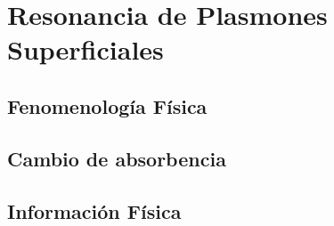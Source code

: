 \section{Resonancia de Plasmones Superficiales}

\subsection{Fenomenología Física}

\subsection{Cambio de absorbencia}

\subsection{Información Física}
